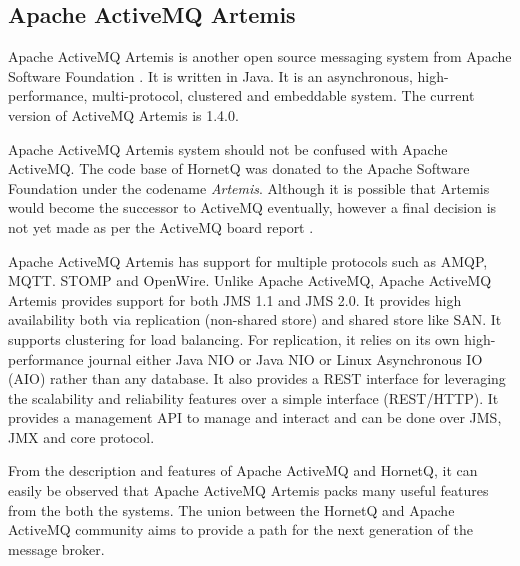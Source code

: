\subsection{Apache ActiveMQ Artemis}

Apache ActiveMQ Artemis is another open source messaging system from Apache Software Foundation \parencite{artemis_home}. It is written in Java. It is an asynchronous, high-performance, multi-protocol, clustered and embeddable system. The current version of ActiveMQ Artemis is 1.4.0.

Apache ActiveMQ Artemis system should not be confused with Apache ActiveMQ. The code base of HornetQ was donated to the Apache Software Foundation under the codename \textit{Artemis}. Although it is possible that Artemis would become the successor to ActiveMQ eventually, however a final decision is not yet made as per the ActiveMQ board report \parencite{artemis_vs_activemq}.

Apache ActiveMQ Artemis has support for multiple protocols such as AMQP, MQTT. STOMP and OpenWire. Unlike Apache ActiveMQ, Apache ActiveMQ Artemis provides support for both JMS 1.1 and JMS 2.0. It provides high availability both via replication (non-shared store) and shared store like SAN. It supports clustering for load balancing. For replication, it relies on its own high-performance journal either Java NIO or Java NIO or Linux Asynchronous IO (AIO) rather than any database. It also provides a REST interface for leveraging the scalability and reliability features over a simple interface (REST/HTTP). It provides a management API to manage and interact and can be done over JMS, JMX and core protocol.

From the description and features of Apache ActiveMQ and HornetQ, it can easily be observed that Apache ActiveMQ Artemis packs many useful features from the both the systems. The union between the HornetQ and Apache ActiveMQ community aims to provide a path for the next generation of the message broker. 
